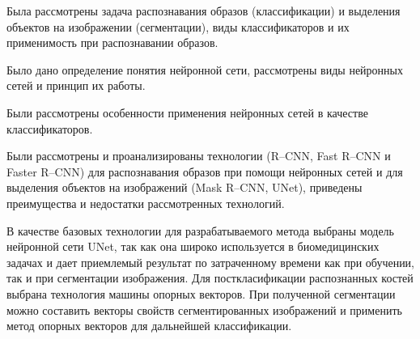 Была рассмотрены задача распознавания образов (классификации) и выделения объектов на изображении (сегментации), виды классификаторов и их применимость при распознавании образов.

Было дано определение понятия нейронной сети, рассмотрены виды нейронных сетей и принцип их работы.

Были рассмотрены особенности применения нейронных сетей в качестве классификаторов.

Были рассмотрены и проанализированы технологии (R--CNN, Fast R--CNN и Faster R--CNN) для распознавания образов при помощи нейронных сетей и для выделения объектов на изображений (Mask R--CNN, UNet), приведены преимущества и недостатки рассмотренных технологий.

В качестве базовых технологии для разрабатываемого метода выбраны модель нейронной сети UNet, так как она широко используется в биомедицинских задачах и дает приемлемый результат по затраченному времени как при обучении, так и при сегментации изображения. Для посткласификации распознанных костей выбрана технология машины опорных векторов. При полученной сегментации можно составить векторы свойств сегментированных изображений и применить метод опорных векторов для дальнейшей классификации.